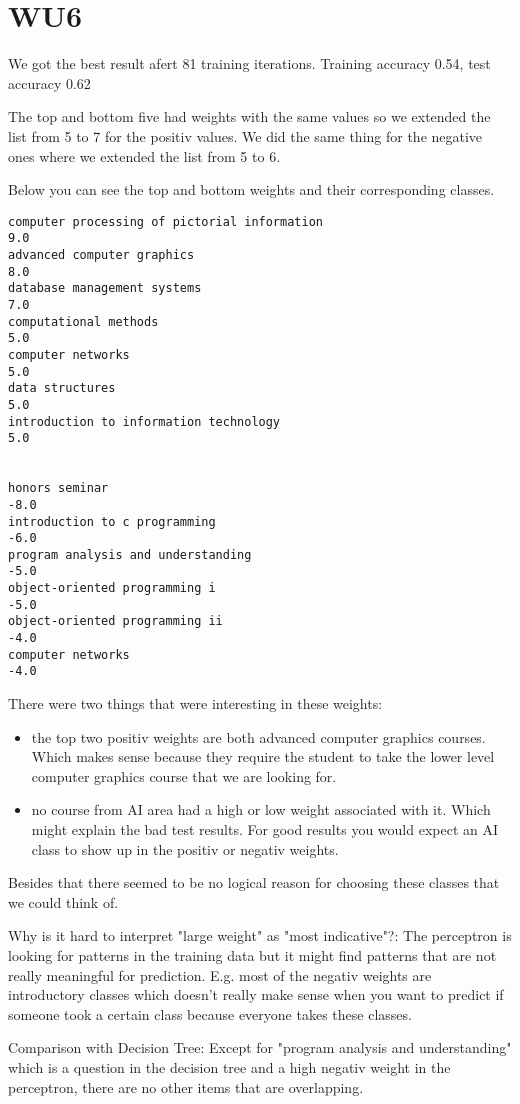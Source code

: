 \section*{WU6}
We got the best result afert 81 training iterations.
Training accuracy 0.54, test accuracy 0.62


The top and bottom five had weights with the same values so we extended the list from 5 to 7 for the positiv values.
We did the same thing for the negative ones where we extended the list from 5 to 6.

Below you can see the top and bottom weights and their corresponding classes.


\begin{verbatim}
computer processing of pictorial information
9.0
advanced computer graphics
8.0
database management systems
7.0
computational methods
5.0
computer networks
5.0
data structures
5.0
introduction to information technology
5.0


honors seminar
-8.0
introduction to c programming
-6.0
program analysis and understanding
-5.0
object-oriented programming i
-5.0
object-oriented programming ii
-4.0
computer networks
-4.0
\end{verbatim}
There were two things that were interesting in these weights:
\begin{itemize}
 \item the top two positiv weights are both advanced computer graphics courses. Which makes sense because they require the student to take the lower level
 computer graphics course that we are looking for.
 \item no course from AI area had a high or low weight associated with it. Which might explain the bad test results. For good results you would expect an AI class to show up in the positiv or negativ weights.
\end{itemize}

Besides that there seemed to be no logical reason for choosing these classes that we could think of.

Why is it hard to interpret "large weight" as "most indicative"?:
       The perceptron is looking for patterns in the training data but it might find patterns that are not really meaningful for prediction. E.g. most of
       the     negativ weights are introductory classes which doesn't really make sense when you want to predict if someone took a certain class because
       everyone takes these classes.

Comparison with Decision Tree:
       Except for "program analysis and understanding" which is a question in the decision tree and a high negativ weight in the perceptron, there are
       no other items that are overlapping.
